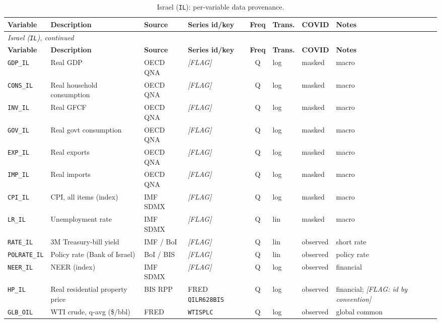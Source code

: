 {\small
\begin{longtable}{@{}lp{2.9cm}p{1.9cm}p{2.0cm}cp{1.4cm}p{1.7cm}p{2.6cm}@{}}
\caption{Israel (\texttt{IL}): per-variable data provenance.}\label{tab:data:IL}\\
\toprule
\textbf{Variable} & \textbf{Description} & \textbf{Source} & \textbf{Series id/key} & \textbf{Freq} & \textbf{Trans.} & \textbf{COVID} & \textbf{Notes}\\
\midrule
\endfirsthead
\multicolumn{8}{l}{\small\itshape Israel (\texttt{IL}), continued}\\
\toprule
\textbf{Variable} & \textbf{Description} & \textbf{Source} & \textbf{Series id/key} & \textbf{Freq} & \textbf{Trans.} & \textbf{COVID} & \textbf{Notes}\\
\midrule
\endhead
\bottomrule
\endfoot
\texttt{GDP\_IL} & Real GDP & OECD QNA & \textit{[FLAG]} & Q & log & masked & macro\\
\texttt{CONS\_IL} & Real household consumption & OECD QNA & \textit{[FLAG]} & Q & log & masked & macro\\
\texttt{INV\_IL} & Real GFCF & OECD QNA & \textit{[FLAG]} & Q & log & masked & macro\\
\texttt{GOV\_IL} & Real govt consumption & OECD QNA & \textit{[FLAG]} & Q & log & masked & macro\\
\texttt{EXP\_IL} & Real exports & OECD QNA & \textit{[FLAG]} & Q & log & masked & macro\\
\texttt{IMP\_IL} & Real imports & OECD QNA & \textit{[FLAG]} & Q & log & masked & macro\\
\texttt{CPI\_IL} & CPI, all items (index) & IMF SDMX & \textit{[FLAG]} & Q & log & masked & macro\\
\texttt{LR\_IL} & Unemployment rate & IMF SDMX & \textit{[FLAG]} & Q & lin & masked & macro\\
\texttt{RATE\_IL} & 3M Treasury-bill yield & IMF / BoI & \textit{[FLAG]} & Q & lin & observed & short rate\\
\texttt{POLRATE\_IL} & Policy rate (Bank of Israel) & BoI / BIS & \textit{[FLAG]} & Q & lin & observed & policy rate\\
\texttt{NEER\_IL} & NEER (index) & IMF SDMX & \textit{[FLAG]} & Q & log & observed & financial\\
\texttt{HP\_IL} & Real residential property price & BIS RPP & FRED \texttt{QILR628BIS} & Q & log & observed & financial; \textit{[FLAG: id by convention]}\\
\texttt{GLB\_OIL} & WTI crude, q-avg (\$/bbl) & FRED & \texttt{WTISPLC} & Q & log & observed & global common\\

\end{longtable}}
